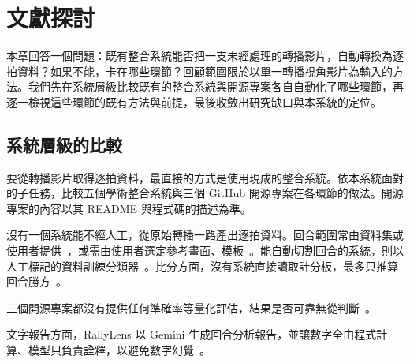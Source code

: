 \chapter{文獻探討}
\label{ch:related-work}

本章回答一個問題：既有整合系統能否把一支未經處理的轉播影片，自動轉換為逐拍資料？如果不能，卡在哪些環節？回顧範圍限於以單一轉播視角影片為輸入的方法。我們先在系統層級比較既有的整合系統與開源專案各自自動化了哪些環節，再逐一檢視這些環節的既有方法與前提，最後收斂出研究缺口與本系統的定位。

\section{系統層級的比較}
\label{sec:system-comparison}

要從轉播影片取得逐拍資料，最直接的方式是使用現成的整合系統。依本系統面對的子任務，比較五個學術整合系統與三個 GitHub 開源專案在各環節的做法。開源專案的內容以其 README 與程式碼的描述為準。

沒有一個系統能不經人工，從原始轉播一路產出逐拍資料。回合範圍常由資料集或使用者提供~\cite{guo2025coach,monotrack,rallylens}，或需由使用者選定參考畫面、模板~\cite{bosi2021thesis,rallylive}。能自動切割回合的系統，則以人工標記的資料訓練分類器~\cite{chien2023hitframe,ghosh2018structured}。比分方面，沒有系統直接讀取計分板，最多只推算回合勝方~\cite{guo2025coach,ghosh2018structured}。

三個開源專案都沒有提供任何準確率等量化評估，結果是否可靠無從判斷~\cite{rallylens,visionai,rallylive}。

文字報告方面，RallyLens 以 Gemini 生成回合分析報告，並讓數字全由程式計算、模型只負責詮釋，以避免數字幻覺~\cite{rallylens}。

